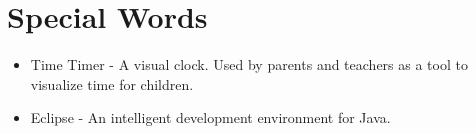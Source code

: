 \chapter*{Special Words}

\begin{itemize}

	\item Time Timer - A visual clock. Used by parents and teachers as a tool to visualize time for children.
	\item Eclipse - An intelligent development environment for Java.

\end{itemize}